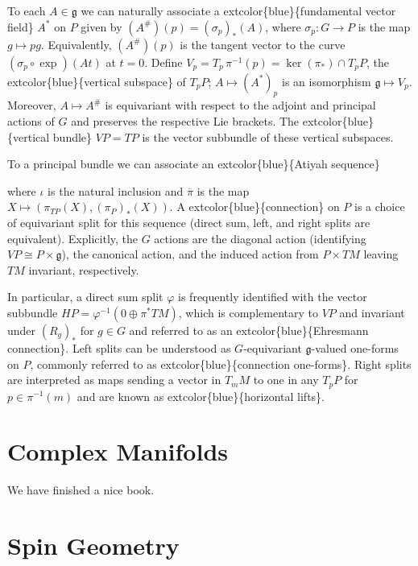 \documentclass[
]{book}
\begin{document}
To each \(A \in \mathfrak{g}\) we can naturally associate a extcolor\{blue\}\{fundamental vector field\} \(A^*\) on \(P\) given by \((A^\#)(p) = (\sigma_p)_*(A)\), where \(\sigma_p : G \to P\) is the map \(g \mapsto pg\). Equivalently, \((A^\#)(p)\) is the tangent vector to the curve \((\sigma_p \circ \exp)(At)\) at \(t = 0\). Define \(V_p = T_p \, \pi^{-1}(p) = \ker(\pi_*) \cap T_p P\), the extcolor\{blue\}\{vertical subspace\} of \(T_p P\); \(A \mapsto (A^*)_p\) is an isomorphism \(\mathfrak{g} \mapsto V_p\). Moreover, \(A \mapsto A^\#\) is equivariant with respect to the adjoint and principal actions of \(G\) and preserves the respective Lie brackets. The extcolor\{blue\}\{vertical bundle\} \(VP = TP\) is the vector subbundle of these vertical subspaces.

To a principal bundle we can associate an extcolor\{blue\}\{Atiyah sequence\}

where \(\iota\) is the natural inclusion and \(\overline{\pi}\) is the map \(X \mapsto (\pi_{TP}(X), (\pi_P)_*(X))\). A extcolor\{blue\}\{connection\} on \(P\) is a choice of equivariant split for this sequence (direct sum, left, and right splits are equivalent). Explicitly, the \(G\) actions are the diagonal action (identifying \(VP \cong P \times \mathfrak{g}\)), the canonical action, and the induced action from \(P \times TM\) leaving \(TM\) invariant, respectively.

In particular, a direct sum split \(\varphi\) is frequently identified with the vector subbundle \(HP = \varphi^{-1}(0 \oplus \pi^* TM)\), which is complementary to \(VP\) and invariant under \((R_g)_*\) for \(g \in G\) and referred to as an extcolor\{blue\}\{Ehresmann connection\}. Left splits can be understood as \(G\)-equivariant \(\mathfrak{g}\)-valued one-forms on \(P\), commonly referred to as extcolor\{blue\}\{connection one-forms\}. Right splits are interpreted as maps sending a vector in \(T_m M\) to one in any \(T_p P\) for \(p \in \pi^{-1}(m)\) and are known as extcolor\{blue\}\{horizontal lifts\}.

\hypertarget{complex-manifolds}{%
\chapter{Complex Manifolds}\label{complex-manifolds}}

We have finished a nice book.

\hypertarget{spin-geometry}{%
\chapter{Spin Geometry}\label{spin-geometry}}
\end{document}
